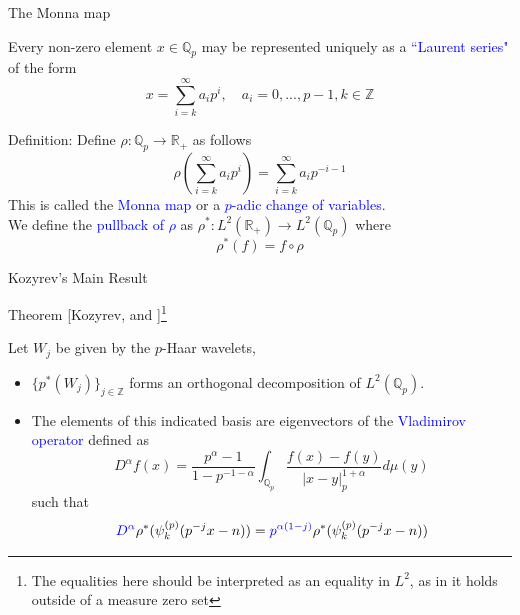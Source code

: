 \documentclass[hyperref, notheorems]{beamer}
\newcommand{\Rbb}{\mathbb{R}}
\newcommand{\Zbb}{\mathbb{Z}}
\newcommand{\Qbb}{\mathbb{Q}}
\newcommand{\txtblue}{\textcolor{blue}}
\theoremstyle{definition}
\begin{document}
\begin{frame}{The Monna map}

Every non-zero element $x \in \Qbb_p$ may be represented uniquely as a \txtblue{``Laurent series"} of the form
    \[x = \sum_{i = k}^{\infty} a_i p^i,\quad a_i = 0, ..., p-1, k \in \Zbb\]

\begin{block}{Definition:}
    Define $\rho: \Qbb_p \to \Rbb_+$ as follows
    \[\rho(\sum_{i = k}^{\infty} a_i p^i) = \sum_{i = k}^{\infty} a_i p^{-i - 1}\]
    This is called the \txtblue{Monna map} or a \txtblue{$p$-adic change of variables}.
    \vspace{\baselineskip}\\
    We define the \txtblue{pullback of $\rho$} as $\rho^*: L^2(\Rbb_+) \to L^2(\Qbb_p)$ where
    \[\rho^*(f) = f \circ \rho\]
\end{block}
    
\end{frame}


\begin{frame}{Kozyrev's Main Result}

\begin{block}{Theorem [Kozyrev, \cite{kozyrev_2002} and \cite{kozyrev_khrennikov_shelkovich_2014}]\footnote{The equalities here should be interpreted as an equality in $L^2$, as in it holds outside of a measure zero set}}

Let $W_j$ be given by the $p$-Haar wavelets,
\begin{itemize}
    \item $\{p^*(W_j)\}_{j \in \Zbb}$ forms an orthogonal decomposition of $L^2(\Qbb_p)$.
    \item The elements of this indicated basis are eigenvectors of the \txtblue{Vladimirov operator} defined as
    \[D^\alpha f(x) = \frac{p^\alpha - 1}{1 - p^{-1 - \alpha}} \int_{\Qbb_p} \frac{f(x) - f(y)}{|x - y|^{1+\alpha}_p} d\mu(y)\]
    such that
    \[\txtblue{D^\alpha} \rho^*(\psi_k^{(p)}(p^{-j} x - n)) = \txtblue{p^{\alpha(1 - j)}} \rho^*(\psi_k^{(p)}(p^{-j} x - n))\]
\end{itemize}
\end{block}
\end{frame}
\end{document}
